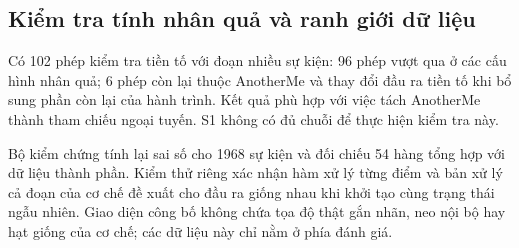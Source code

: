 \subsection{Kiểm tra tính nhân quả và ranh giới dữ liệu}

Có 102 phép kiểm tra tiền tố với đoạn nhiều sự kiện: 96 phép vượt qua ở các cấu hình nhân quả; 6 phép còn lại thuộc AnotherMe và thay đổi đầu ra tiền tố khi bổ sung phần còn lại của hành trình. Kết quả phù hợp với việc tách AnotherMe thành tham chiếu ngoại tuyến. S1 không có đủ chuỗi để thực hiện kiểm tra này.

Bộ kiểm chứng tính lại sai số cho 1968 sự kiện và đối chiếu 54 hàng tổng hợp với dữ liệu thành phần. Kiểm thử riêng xác nhận hàm xử lý từng điểm và bản xử lý cả đoạn của cơ chế đề xuất cho đầu ra giống nhau khi khởi tạo cùng trạng thái ngẫu nhiên. Giao diện công bố không chứa tọa độ thật gắn nhãn, neo nội bộ hay hạt giống của cơ chế; các dữ liệu này chỉ nằm ở phía đánh giá.
